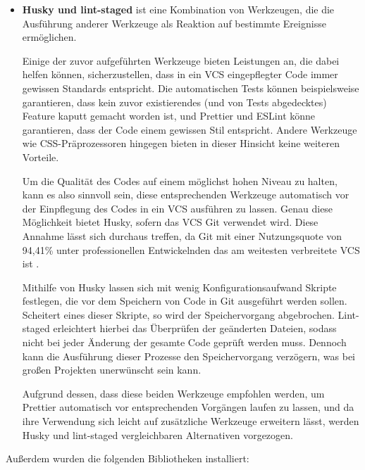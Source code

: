 \begin{itemize}
\item \textbf{Husky und lint-staged} ist eine Kombination von Werkzeugen, die die Ausführung anderer Werkzeuge als Reaktion auf bestimmte Ereignisse ermöglichen.

Einige der zuvor aufgeführten Werkzeuge bieten Leistungen an, die dabei helfen können, sicherzustellen, dass in ein \gls{VCS} eingepflegter Code immer gewissen Standards entspricht. Die automatischen Tests können beispielsweise garantieren, dass kein zuvor existierendes (und von Tests abgedecktes) Feature kaputt gemacht worden ist, und Prettier und ESLint könne garantieren, dass der Code einem gewissen Stil entspricht. Andere Werkzeuge wie CSS-Präprozessoren hingegen bieten in dieser Hinsicht keine weiteren Vorteile.

Um die Qualität des Codes auf einem möglichst hohen Niveau zu halten, kann es also sinnvoll sein, diese entsprechenden Werkzeuge automatisch vor der Einpflegung des Codes in ein \gls{VCS} ausführen zu lassen. Genau diese Möglichkeit bietet Husky, sofern das \gls{VCS} Git verwendet wird. Diese Annahme lässt sich durchaus treffen, da Git mit einer Nutzungsquote von 94,41\% unter professionellen Entwickelnden das am weitesten verbreitete \gls{VCS} ist \cite{git_usage}.

Mithilfe von Husky lassen sich mit wenig Konfigurationsaufwand Skripte festlegen, die vor dem Speichern von Code in Git ausgeführt werden sollen. Scheitert eines dieser Skripte, so wird der Speichervorgang abgebrochen. Lint-staged erleichtert hierbei das Überprüfen der geänderten Dateien, sodass nicht bei jeder Änderung der gesamte Code geprüft werden muss. Dennoch kann die Ausführung dieser Prozesse den Speichervorgang verzögern, was bei großen Projekten unerwünscht sein kann.

Aufgrund dessen, dass diese beiden Werkzeuge empfohlen werden, um Prettier automatisch vor entsprechenden Vorgängen laufen zu lassen, und da ihre Verwendung sich leicht auf zusätzliche Werkzeuge erweitern lässt, werden Husky und lint-staged vergleichbaren Alternativen vorgezogen.
\end{itemize}

Außerdem wurden die folgenden Bibliotheken installiert:

